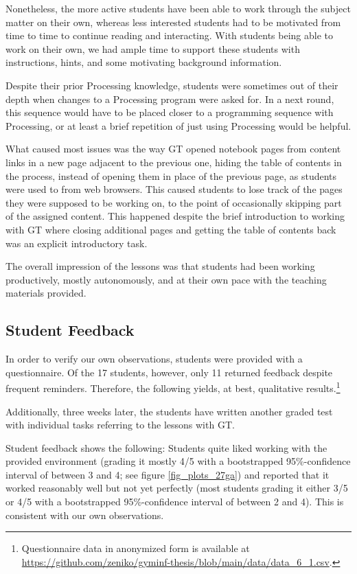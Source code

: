 Nonetheless, the more active students have been able to work through the subject matter on their own, whereas less interested students had to be motivated from time to time to continue reading and interacting. With students being able to work on their own, we had ample time to support these students with instructions, hints, and some motivating background information.

Despite their prior Processing knowledge, students were sometimes out of their depth when changes to a Processing program were asked for. In a next round, this sequence would have to be placed closer to a programming sequence with Processing, or at least a brief repetition of just using Processing would be helpful.

What caused most issues was the way \ac{GT} opened notebook pages from content links in a new page adjacent to the previous one, hiding the table of contents in the process, instead of opening them in place of the previous page, as students were used to from web browsers. This caused students to lose track of the pages they were supposed to be working on, to the point of occasionally skipping part of the assigned content. This happened despite the brief introduction to working with \ac{GT} where closing additional pages and getting the table of contents back was an explicit introductory task.

The overall impression of the lessons was that students had been working productively, mostly autonomously, and at their own pace with the teaching materials provided.


\subsection{Student Feedback}

In order to verify our own observations, students were provided with a questionnaire. Of the 17 students, however, only 11 returned feedback despite frequent reminders. Therefore, the following yields, at best, qualitative results.\footnote{Questionnaire data in anonymized form is available at \url{https://github.com/zeniko/gyminf-thesis/blob/main/data/data_6_1.csv}.}

Additionally, three weeks later, the students have written another graded test with individual tasks referring to the lessons with \ac{GT}.

Student feedback shows the following: Students quite liked working with the provided environment (grading it mostly 4/5 with a bootstrapped 95\%-confidence interval of between 3 and 4; see figure \ref{fig_plots_27ga}) and reported that it worked reasonably well but not yet perfectly (most students grading it either 3/5 or 4/5 with a bootstrapped 95\%-confidence interval of between 2 and 4). This is consistent with our own observations.

